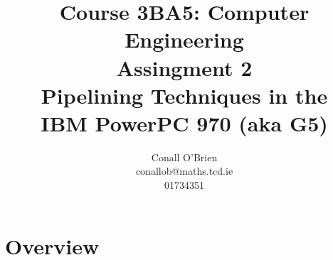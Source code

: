 \documentclass[a4paper,12pt]{article}
\begin{document}
\title{Course 3BA5: Computer Engineering \\ Assingment 2 \\ Pipelining Techniques in the \\ IBM PowerPC 970 (aka G5)}

\author{Conall O'Brien \\ conallob@maths.tcd.ie \\ 01734351}

\maketitle

\section{Overview}

\cite[]{a1}




\end{document}

